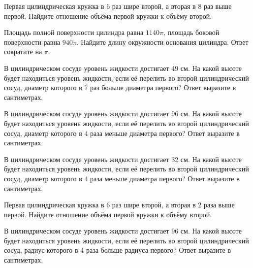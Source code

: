 \documentclass[4apaper]{article}
\begin{document}
\begin{taskBN}{1}
 Первая цилиндрическая кружка в 6 раз шире второй, а вторая в 8 раз выше первой. Найдите отношение объёма первой кружки к объёму второй.
\end{taskBN}

\begin{taskBN}{2}
Площадь полной поверхности цилиндра равна $1140\pi$, площадь боковой поверхности равна $940\pi$. Найдите длину окружности основания цилиндра. Ответ сократите на $\pi$.
\end{taskBN}

\begin{taskBN}{3}
В цилиндрическом сосуде уровень жидкости достигает 49 см. На какой высоте будет находиться уровень жидкости, если её перелить во второй цилиндрический сосуд, диаметр которого в 7 раз больше диаметра первого? Ответ выразите в сантиметрах.
\end{taskBN}

\begin{taskBN}{4}
В цилиндрическом сосуде уровень жидкости достигает 96 см. На какой высоте будет находиться уровень жидкости, если её перелить во второй цилиндрический сосуд, диаметр которого в 4 раза меньше диаметра первого? Ответ выразите в сантиметрах.
\end{taskBN}

\begin{taskBN}{5}
В цилиндрическом сосуде уровень жидкости достигает 32 см. На какой высоте будет находиться уровень жидкости, если её перелить во второй цилиндрический сосуд, диаметр которого в 4 раза меньше диаметра первого? Ответ выразите в сантиметрах.
\end{taskBN}

\begin{taskBN}{6}
 Первая цилиндрическая кружка в 6 раз шире второй, а вторая в 2 раза выше первой. Найдите отношение объёма первой кружки к объёму второй.
\end{taskBN}

\begin{taskBN}{7}
В цилиндрическом сосуде уровень жидкости достигает 96 см. На какой высоте будет находиться уровень жидкости, если её перелить во второй цилиндрический сосуд, радиус которого в 4 раза больше радиуса первого? Ответ выразите в сантиметрах.
\end{taskBN}
\end{document}
